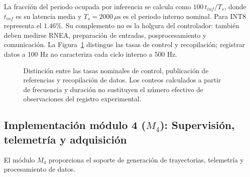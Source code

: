 \documentclass[12pt]{article}
\begin{document}
La fracción del periodo ocupada por inferencia se calcula como $100\,t_{inf}/T_s$, donde $t_{inf}$ es su latencia media y $T_s=2000\,\mu\text{s}$ es el periodo interno nominal. Para INT8 representa el $1.46\%$. Su complemento no es la holgura del controlador: también deben medirse RNEA, preparación de entradas, posprocesamiento y comunicación. La Figura~\ref{fig:distribucion_latencia_m3} distingue las tasas de control y recopilación; registrar datos a 100 Hz no caracteriza cada ciclo interno a 500 Hz.

\begin{figure}[htbp]
\centering
{}
\caption{Distinción entre las tasas nominales de control, publicación de referencias y recopilación de datos. Los conteos calculados a partir de frecuencia y duración no sustituyen el número efectivo de observaciones del registro experimental.}
\label{fig:distribucion_latencia_m3}
\end{figure}


\subsection{Implementación módulo 4 ($M_4$): Supervisión, telemetría y adquisición}
\label{sec:imp_m4}

El módulo $M_4$ proporciona el soporte de generación de trayectorias, telemetría y procesamiento de datos.
\end{document}
